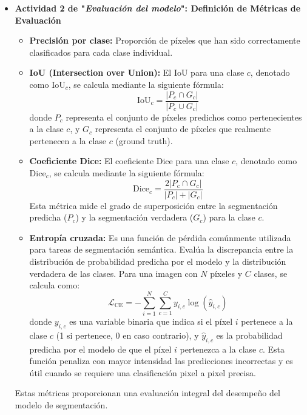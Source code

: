 \begin{enumerate}
\begin{itemize}
  \item\textbf{Actividad 2 de "\textit{Evaluación del modelo}": Definición de Métricas de Evaluación}
    \begin{itemize}
  \item \textbf{Precisión por clase:} Proporción de píxeles que han sido correctamente clasificados para cada clase individual.

  \item \textbf{IoU (Intersection over Union):} El IoU para una clase $c$, denotado como $\text{IoU}_c$, se calcula mediante la siguiente fórmula:
$$\text{IoU}_c = \frac{|P_c \cap G_c|}{|P_c \cup G_c|}$$
donde $P_c$ representa el conjunto de píxeles predichos como pertenecientes a la clase $c$, y $G_c$ representa el conjunto de píxeles que realmente pertenecen a la clase $c$ (ground truth).

  \item \textbf{Coeficiente Dice:} El coeficiente Dice para una clase $c$, denotado como $\text{Dice}_c$, se calcula mediante la siguiente fórmula:
$$\text{Dice}_c = \frac{2|P_c \cap G_c|}{|P_c| + |G_c|}$$
Esta métrica mide el grado de superposición entre la segmentación predicha ($P_c$) y la segmentación verdadera ($G_c$) para la clase $c$.
 

  \item \textbf{Entropía cruzada:} Es una función de pérdida comúnmente utilizada para tareas de segmentación semántica. Evalúa la discrepancia entre la distribución de probabilidad predicha por el modelo y la distribución verdadera de las clases. Para una imagen con $N$ píxeles y $C$ clases, se calcula como:
$$\mathcal{L}_{\text{CE}} = -\sum_{i=1}^{N} \sum_{c=1}^{C} y_{i,c} \log(\hat{y}_{i,c})$$
donde $y_{i,c}$ es una variable binaria que indica si el píxel $i$ pertenece a la clase $c$ (1 si pertenece, 0 en caso contrario), y $\hat{y}_{i,c}$ es la probabilidad predicha por el modelo de que el píxel $i$ pertenezca a la clase $c$. Esta función penaliza con mayor intensidad las predicciones incorrectas y es útil cuando se requiere una clasificación pixel a pixel precisa.
\end{itemize}

Estas métricas proporcionan una evaluación integral del desempeño del modelo de segmentación.



\end{itemize}
\end{enumerate}
